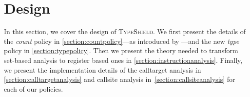 \section{Design}
\label{chapter:Design}

In this section, we cover the design of \textsc{TypeShield}. We first present the details of the 
\emph{count} policy in \cref{section:countpolicy}---as introduced by \cite{veen:typearmor}---and the
new \emph{type} policy in \cref{section:typepolicy}. 
Then we present the theory needed to transform set-based analysis to register based ones in \cref{section:instructionanalysis}. 
Finally, we present the implementation details of the calltarget analysis in 
\cref{section:calltargetanalysis} and callsite analysis in~\cref{section:callsiteanalysis} 
for each of our policies. 

